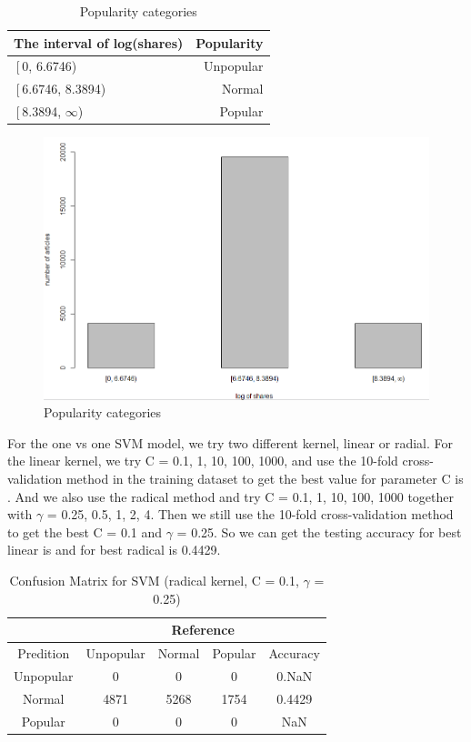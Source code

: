 \documentclass[11pt]{article}
\begin{document}
    \begin{table}[h]
        \centering
        \caption{Popularity categories}
        \begin{tabular}{ l | r }
            \hline\hline
            The interval of log(shares) & Popularity\\
            \hline
            $\left[$0, 6.6746) & Unpopular \\
            $\left[$6.6746, 8.3894) & Normal \\
            $\left[$8.3894, $\infty$) & Popular \\
            \hline\hline
        \end{tabular}
        \label{table:Popularity}
    \end{table}

    \begin{figure}[h]
        \centering
        \includegraphics[width=0.7\linewidth]{poplularity.png}
        \caption{Popularity categories}
    \end{figure}

For the one vs one SVM model, we try two different kernel, linear or radial. For the linear kernel, we try C = 0.1, 1, 10, 100, 1000, and use the 10-fold cross-validation method in the training dataset to get the best value for parameter C is . And we also use the radical method and try C = 0.1, 1, 10, 100, 1000 together with $\gamma$ = 0.25, 0.5, 1, 2, 4. Then we still use the 10-fold cross-validation method to get the best C = 0.1 and $\gamma$ = 0.25. So we can get the testing accuracy for best linear is and for best radical is 0.4429.

    \begin{table}[h]
        \centering
        \caption{Confusion Matrix for SVM (radical kernel, C = 0.1, $\gamma$ = 0.25)}
        \begin{tabular}{ c | c | c | c | c }
            \hline\hline
            {} & \multicolumn{4}{c}{Reference} \\
            \hline
            Predition & Unpopular & Normal & Popular & Accuracy\\
            \hline
            Unpopular & 0 & 0 & 0 & 0.NaN\\
            \hline
            Normal & 4871 & 5268 & 1754 & 0.4429\\
            \hline
            Popular & 0 & 0 & 0 & NaN\\
            \hline\hline
        \end{tabular}
        \label{table:knn}
    \end{table}
\end{document}
